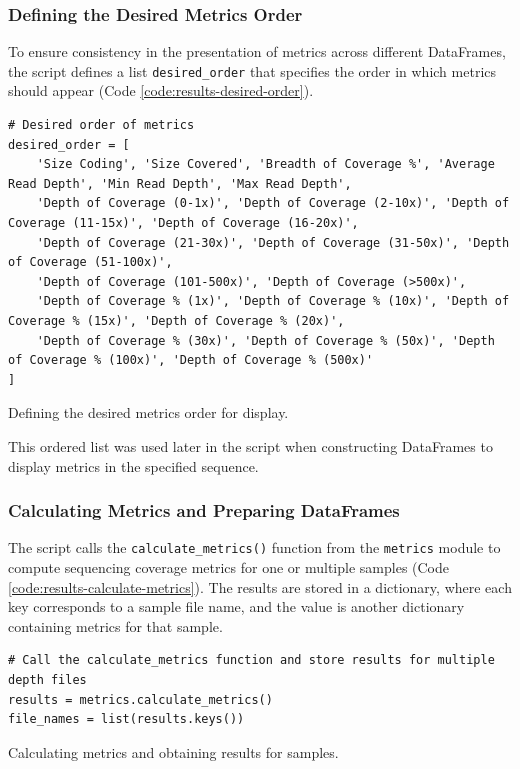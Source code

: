 \subsubsection{\textbf{Defining the Desired Metrics Order}}

To ensure consistency in the presentation of metrics across different DataFrames, the script defines a list \texttt{desired\_order} that specifies the order in which metrics should appear (Code \ref{code:results-desired-order}).

\begin{longlisting}
\begin{verbatim}
# Desired order of metrics
desired_order = [
    'Size Coding', 'Size Covered', 'Breadth of Coverage %', 'Average Read Depth', 'Min Read Depth', 'Max Read Depth',
    'Depth of Coverage (0-1x)', 'Depth of Coverage (2-10x)', 'Depth of Coverage (11-15x)', 'Depth of Coverage (16-20x)',
    'Depth of Coverage (21-30x)', 'Depth of Coverage (31-50x)', 'Depth of Coverage (51-100x)',
    'Depth of Coverage (101-500x)', 'Depth of Coverage (>500x)',
    'Depth of Coverage % (1x)', 'Depth of Coverage % (10x)', 'Depth of Coverage % (15x)', 'Depth of Coverage % (20x)',
    'Depth of Coverage % (30x)', 'Depth of Coverage % (50x)', 'Depth of Coverage % (100x)', 'Depth of Coverage % (500x)'
]
\end{verbatim}
\caption{Defining the desired metrics order for display.}
\label{code:results-desired-order}
\end{longlisting}

This ordered list was used later in the script when constructing DataFrames to display metrics in the specified sequence.

\subsubsection{\textbf{Calculating Metrics and Preparing DataFrames}}

The script calls the \texttt{calculate\_metrics()} function from the \texttt{metrics} module to compute sequencing coverage metrics for one or multiple samples (Code \ref{code:results-calculate-metrics}). The results are stored in a dictionary, where each key corresponds to a sample file name, and the value is another dictionary containing metrics for that sample.

\begin{longlisting}
\begin{verbatim}
# Call the calculate_metrics function and store results for multiple depth files
results = metrics.calculate_metrics()
file_names = list(results.keys())
\end{verbatim}
\caption{Calculating metrics and obtaining results for samples.}
\label{code:results-calculate-metrics}
\end{longlisting}

